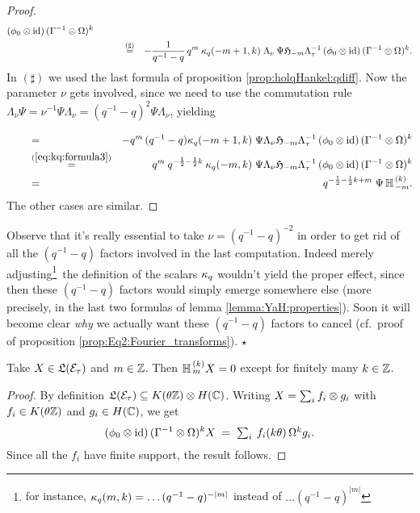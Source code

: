 \begin{proof}
\begin{eqnarray*}
         (\phi_0 \otimes \mbox{\rm id})\,(\Gamma^{-1} \otimes \Omega)^k  \\
&\hspace{3em}\stackrel{(\sharp)}{=}&
       -\frac{1}{q^{-1}-q} \,q^m\: \kappa_q(-m+1,k) \;
       \Lambda_\nu \, \Psi \mathfrak{H}_{-m} \Lambda_\tau^{-1}\,
       (\phi_0 \otimes \mbox{\rm id})\,(\Gamma^{-1} \otimes \Omega)^k.
\end{eqnarray*}
In $(\sharp)$ we used the last formula of proposition
\ref{prop:holqHankel:qdiff}\@. Now the parameter $\nu$ gets
involved, since we need to use the commutation rule
$\Lambda_\nu \Psi = \nu^{-1} \Psi \Lambda_\nu = (q^{-1}-q)^2 \Psi \Lambda_\nu$,
yielding
\begin{eqnarray*}
&\hspace{2em}=\vertXL&
      -q^m \,(q^{-1}-q) \kq(-m+1,k) \; \Psi \Lambda_\nu \holH{-m} \Lambda_\tau^{-1}\,
      (\evzero \tens \id)\,(\Gamma^{-1} \tens \Omega)^k  \\
&\hspace{2em}\stackrel{(\ref{eq:kq:formula3})}{=}&
      q^m \: q^{-\frac{1}{2} -\frac{1}{2}k}\: \kq(-m,k) \;
      \Psi \Lambda_\nu \holH{-m} \Lambda_\tau^{-1}\,
      (\evzero \tens \id)\,(\Gamma^{-1} \tens \Omega)^k  \\
&\hspace{2em}=&   q^{-\frac{1}{2} -\frac{1}{2}k + m} \; \Psi \, \YaH{-m}{k}.
\end{eqnarray*}
The other cases are similar.
\end{proof}

\begin{remark} \rm
Observe that it's really essential to take $\nu=(q^{-1}-q)^{-2}$
in order to get rid of all the $(q^{-1}-q)$ factors involved in
the last computation. Indeed merely adjusting\footnote{for
instance, $\kappa_q(m,k)=\ldots (q^{-1}-q)^{-|m|}$ instead of $\ldots
(q^{-1}-q)^{|m|}$}\ the definition of the scalars $\kappa_q$ wouldn't
yield the proper effect, since then these $(q^{-1}-q)$ factors
would simply emerge somewhere else (more precisely, in the last
two formulas of lemma \ref{lemma:YaH:properties}). Soon it will
become clear {\em why\/} we actually want these $(q^{-1}-q)$
factors to cancel (cf.\ proof of proposition
\ref{prop:Eq2:Fourier_transforms}). \hfill $\star$
\end{remark}


\begin{lemma} \label{lemma:finite_support}
Take $X\in \mathfrak{L}(\mathcal E_\tau)$ and $m\in \mathbb{Z}$.
Then $\mathbb{H}_{\,m}^{\,(k)} X = 0$ except for finitely many $k\in\mathbb{Z}$.
\end{lemma}
\begin{proof}
By definition $\mathfrak{L}(\mathcal E_\tau) \subseteq K(\theta \mathbb{Z}) \otimes H(\mathbb{C})$.
Writing $X=\sum_i f_i \otimes g_i$ with $f_i \in K(\theta \mathbb{Z})$ and $g_i\in H(\mathbb{C})$, we get
$$ (\phi_0 \otimes \mbox{\rm id})\,(\Gamma^{-1} \otimes \Omega)^k X
       \;=\; \textstyle \sum_i\:  f_i(k\theta) \, \Omega^k  g_i.   $$
Since all the $f_i$ have finite support, the result follows.
\end{proof}

